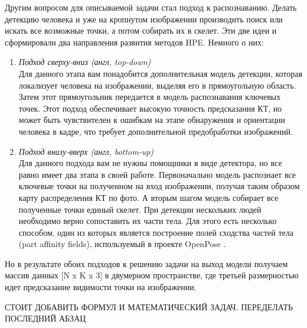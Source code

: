 \hfill \break

Другим вопросом для описываемой задачи стал подход к распознаванию. Делать детекцию человека и уже на кропнутом изображении производить поиск или искать все возможные точки, а потом собирать их в скелет. Эти две идеи и сформировали два направления развития методов HPE. Немного о них:
\begin{enumerate}
	\item \textit{Подход сверху-вниз (англ, top-down)}\\
	Для данного этапа вам понадобится дополнительная модель детекции, которая локализует человека на изображении, выделяя его в прямоугольную область. Затем этот прямоугольник передается в модель распознавания ключевых точек. Этот подход обеспечивает высокую точность предсказания КТ, но может быть чувствителен к ошибкам на этапе обнаружения и ориентации человека в кадре, что требует дополнительной предобработки изображений.
	\item \textit{Подход внизу-вверх (англ, bottom-up)}\\
	Для данного подхода вам не нужны помощники в виде детектора, но все равно имеет два этапа в своей работе. Первоначально модель распознает все ключевые точки на полученном на вход изображении, получая таким образом карту распределения КТ по фото. А вторым шагом модель собирает все полученные точки единый скелет. При детекции нескольких людей необходимо верно сопоставить их части тела. Для этого есть несколько способом, один из которых является построение полей сходства частей тела (part affinity fields), используемый в проекте OpenPose \cite{OpenPose}.
\end{enumerate}

Но в результате обоих подходов к решению задачи на выход модели получаем массив данных [N x K x 3] в двумерном пространстве, где третьей размерностью идет предсказание видимости точки на изображении.

СТОИТ ДОБАВИТЬ ФОРМУЛ И МАТЕМАТИЧЕСКИЙ ЗАДАЧ. ПЕРЕДЕЛАТЬ ПОСЛЕДНИЙ АБЗАЦ


\newpage